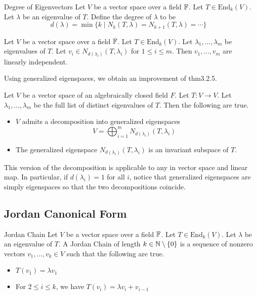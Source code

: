 \documentclass[a4paper]{article}
\begin{document}
\begin{defn}{Degree of Eigenvectors}{} Let $V$ be a vector space over a field $\mathbb{F}$. Let $T\in\text{End}_k(V)$. Let $\lambda$ be an eigenvalue of $T$. Define the degree of $\lambda$ to be $$d(\lambda)=\min\{k\;|\;N_k(T,\lambda)=N_{k+1}(T,\lambda)=\cdots\}$$
\end{defn}

\begin{prp}{}{} Let $V$ be a vector space over a field $\mathbb{F}$. Let $T\in\text{End}_k(V)$. Let $\lambda_1,\dots,\lambda_m$ be eigenvalues of $T$. Let $v_i\in N_{d(\lambda_i)}(T,\lambda_i)$ for $1\leq i\leq m$. Then $v_1,\dots,v_m$ are linearly independent. 
\end{prp}

Using generalized eigenspaces, we obtain an improvement of thm3.2.5. 
\begin{thm}{}{} Let $V$ be a vector space of an algebraically closed field $F$. Let $T:V\to V$. Let $\lambda_1,\dots,\lambda_m$ be the full list of distinct eigenvalues of $T$. Then the following are true. 
\begin{itemize}
\item $V$ admits a decomposition into generalized eigenspaces $$V=\bigoplus_{i=1}^mN_{d(\lambda_i)}(T,\lambda_i)$$
\item The generalized eigenspace $N_{d(\lambda_i)}(T,\lambda_i)$ is an invariant subspace of $T$. 
\end{itemize}
\end{thm}

This version of the decomposition is applicable to any in vector space and linear map. In particular, if $d(\lambda_i)=1$ for all $i$, notice that generalized eigenspaces are simply eigenspaces so that the two decompositions coincide. 

\subsection{Jordan Canonical Form}
\begin{defn}{Jordan Chain}{} Let $V$ be a vector space over a field $\mathbb{F}$. Let $T\in\text{End}_k(V)$. Let $\lambda$ be an eigenvalue of $T$. A Jordan Chain of length $k\in\mathbb{N}\setminus\{0\}$ is a sequence of nonzero vectors $v_1,\dots,v_k\in V$ such that the following are true. 
\begin{itemize}
\item $T(v_1)=\lambda v_1$
\item For $2\leq i\leq k$, we have $T(v_i)=\lambda v_i+v_{i-1}$
\end{itemize}
\end{defn}
\end{document}

